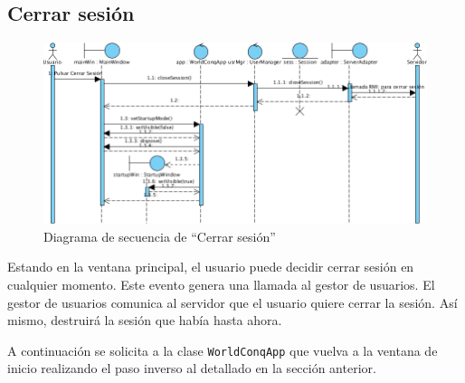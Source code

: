 \subsection{Cerrar sesión}

\begin{figure}[ht]
\centering
\includegraphics[scale=0.6]{img/ch03devel-logout.png}
\caption{Diagrama de secuencia de ``Cerrar sesión''}
\end{figure}

Estando en la ventana principal, el usuario puede decidir cerrar sesión en
cualquier momento. Este evento genera una llamada al gestor de usuarios. El
gestor de usuarios comunica al servidor que el usuario quiere cerrar la sesión.
Así mismo, destruirá la sesión que había hasta ahora.

A continuación se solicita a la clase \texttt{WorldConqApp} que vuelva a la
ventana de inicio realizando el paso inverso al detallado en la sección
anterior.
